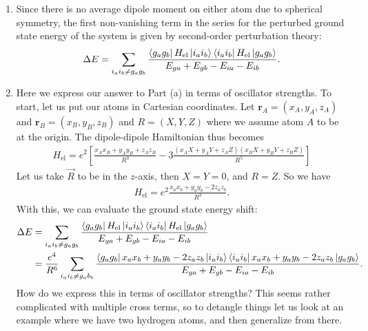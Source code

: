 \documentclass{article}
\theoremstyle{definition}
\newcommand{\f}[2]{\frac{#1}{#2}}
\newcommand{\lb}{\left[}
\newcommand{\rb}{\right]}
\begin{document}
\begin{enumerate}[label=(\alph*)]

\item Since there is no average dipole moment on either atom due to spherical symmetry, the first non-vanishing term in the series for the perturbed ground state energy of the system is given by second-order perturbation theory:
\begin{align*}
\Delta E = \sum_{i_a i_b \neq g_a g_b} \f{  \bra{g_a g_b}  H_\text{el} \ket{i_a i_b } \bra{i_a i_b}  H_\text{el} \ket{g_a g_b} }{E_{ga} + E_{gb}  - E_{ia} - E_{ib}}.
\end{align*}

\item Here we express our answer to Part (a) in terms of oscillator strengths. To start, let us put our atoms in Cartesian coordinates. Let $\mathbf{r}_A = (x_A, y_A, z_A)$ and $\mathbf{r}_B = (x_B, y_B, z_B)$ and $R = (X,Y,Z)$ where we assume atom $A$ to be at the origin. The dipole-dipole Hamiltonian thus becomes
\begin{align*}
H_\text{el}  = e^2 \lb \f{x_A x_B + y_A y_B + z_A z_B}{R^3} - 3\f{ (x_AX + y_A Y + z_A Z)(x_B X + y_B Y + z_B Z) }{R^5} \rb
\end{align*}
Let us take $\vec{R}$ to be in the $z$-axis, then $X=Y=0$, and $R = Z$. So we have
\begin{align*}
H_\text{el} =  e^2 \f{x_a x_b + y_a y_b- 2z_a z_b}{R^3}.
\end{align*}
With this, we can evaluate the ground state energy shift:
\begin{align*}
\Delta E 
&= \sum_{i_a i_b \neq g_a g_b} \f{  \bra{g_a g_b}  H_\text{el} \ket{i_a i_b } \bra{i_a i_b}  H_\text{el} \ket{g_a g_b} }{E_{ga} + E_{gb}  - E_{ia} - E_{ib}} \\
&= \f{e^4}{R^6} \sum_{i_ai_b \neq g_a b_b} 
\f{ 
 \bra{g_a g_b}  x_a x_b + y_a y_b - 2 z_a z_b   \ket{i_a i_b}   
 \bra{i_a i_b}  x_a x_b + y_a y_b - 2 z_a z_b  \ket{g_a g_b}   
}{E_{ga} + E_{gb}  - E_{ia} - E_{ib}}.
\end{align*}
How do we express this in terms of oscillator strengths? This seems rather complicated with multiple cross terms, so to detangle things let us look at an example where we have two hydrogen atoms, and then generalize from there. \\


\end{enumerate}
\end{document}
